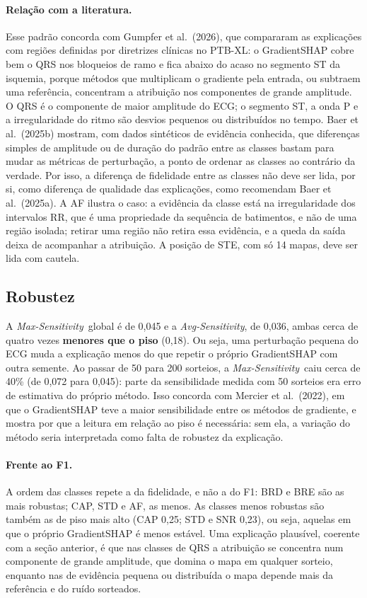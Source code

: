 \documentclass[11pt,a4paper]{article}
\newcommand{\MS}{\textit{Max-Sensitivity}}
\newcommand{\AS}{\textit{Avg-Sensitivity}}
\begin{document}
\paragraph{Relação com a literatura.} Esse padrão concorda com Gumpfer et al.\ (2026), que compararam as explicações com regiões definidas por diretrizes clínicas no PTB-XL: o GradientSHAP cobre bem o QRS nos bloqueios de ramo e fica abaixo do acaso no segmento ST da isquemia, porque métodos que multiplicam o gradiente pela entrada, ou subtraem uma referência, concentram a atribuição nos componentes de grande amplitude. O QRS é o componente de maior amplitude do ECG; o segmento ST, a onda P e a irregularidade do ritmo são desvios pequenos ou distribuídos no tempo. Baer et al.\ (2025b) mostram, com dados sintéticos de evidência conhecida, que diferenças simples de amplitude ou de duração do padrão entre as classes bastam para mudar as métricas de perturbação, a ponto de ordenar as classes ao contrário da verdade. Por isso, a diferença de fidelidade entre as classes não deve ser lida, por si, como diferença de qualidade das explicações, como recomendam Baer et al.\ (2025a). A AF ilustra o caso: a evidência da classe está na irregularidade dos intervalos RR, que é uma propriedade da sequência de batimentos, e não de uma região isolada; retirar uma região não retira essa evidência, e a queda da saída deixa de acompanhar a atribuição. A posição de STE, com só 14 mapas, deve ser lida com cautela.

\subsection{Robustez}\label{sec:res-robustez-sens}
A \MS\ global é de 0,045 e a \AS, de 0,036, ambas cerca de quatro vezes \textbf{menores que o piso} (0,18). Ou seja, uma perturbação pequena do ECG muda a explicação menos do que repetir o próprio GradientSHAP com outra semente. Ao passar de 50 para 200 sorteios, a \MS\ caiu cerca de 40\% (de 0,072 para 0,045): parte da sensibilidade medida com 50 sorteios era erro de estimativa do próprio método. Isso concorda com Mercier et al.\ (2022), em que o GradientSHAP teve a maior sensibilidade entre os métodos de gradiente, e mostra por que a leitura em relação ao piso é necessária: sem ela, a variação do método seria interpretada como falta de robustez da explicação.

\paragraph{Frente ao F1.} A ordem das classes repete a da fidelidade, e não a do F1: BRD e BRE são as mais robustas; CAP, STD e AF, as menos. As classes menos robustas são também as de piso mais alto (CAP 0,25; STD e SNR 0,23), ou seja, aquelas em que o próprio GradientSHAP é menos estável. Uma explicação plausível, coerente com a seção anterior, é que nas classes de QRS a atribuição se concentra num componente de grande amplitude, que domina o mapa em qualquer sorteio, enquanto nas de evidência pequena ou distribuída o mapa depende mais da referência e do ruído sorteados.
\end{document}

